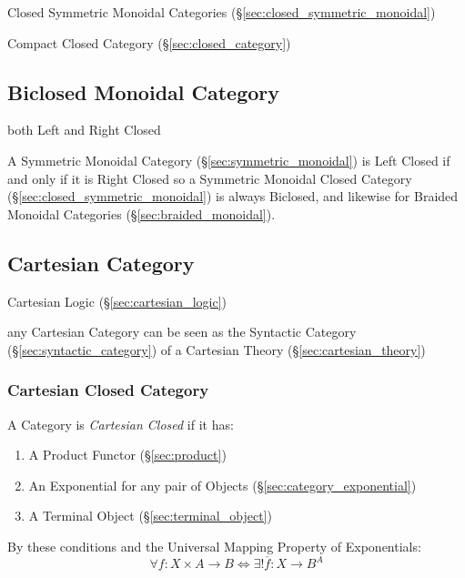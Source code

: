 Closed Symmetric Monoidal Categories
(\S\ref{sec:closed_symmetric_monoidal})

Compact Closed Category (\S\ref{sec:closed_category})



\subsection{Biclosed Monoidal Category}\label{sec:biclosed_monoidal}

both Left and Right Closed

A Symmetric Monoidal Category (\S\ref{sec:symmetric_monoidal}) is Left
Closed if and only if it is Right Closed so a Symmetric Monoidal
Closed Category (\S\ref{sec:closed_symmetric_monoidal}) is always
Biclosed, and likewise for Braided Monoidal Categories
(\S\ref{sec:braided_monoidal}).



\subsection{Cartesian Category}\label{sec:cartesian_category}

Cartesian Logic (\S\ref{sec:cartesian_logic})

any Cartesian Category can be seen as the Syntactic Category
(\S\ref{sec:syntactic_category}) of a Cartesian Theory
(\S\ref{sec:cartesian_theory})



\subsubsection{Cartesian Closed Category}\label{sec:cartesian_closed}

A Category is \emph{Cartesian Closed} if it has:
\begin{enumerate}
  \item A Product Functor (\S\ref{sec:product})
  \item An Exponential for any pair of Objects
    (\S\ref{sec:category_exponential})
  \item A Terminal Object (\S\ref{sec:terminal_object})
\end{enumerate}
By these conditions and the Universal Mapping Property of
Exponentials:
\[
  \forall f : X \times A \rightarrow B \Leftrightarrow
  \exists ! \overline{f} : X \rightarrow B^A
\]

